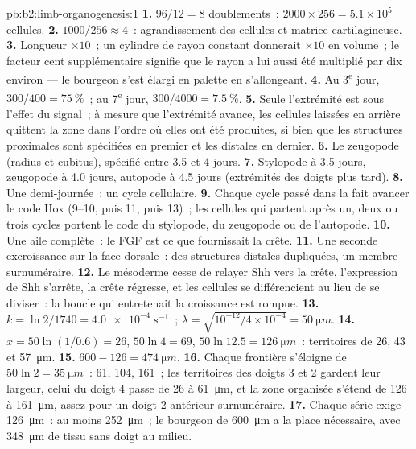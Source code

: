\begin{solution}{pb:b2:limb-organogenesis:1}
\textbf{1.} $96/12 = 8$ doublements~: $2000\times 256 = 5.1\times 10^{5}$
cellules.
\textbf{2.} $1000/256 \approx 4$~: agrandissement des cellules et
matrice cartilagineuse.
\textbf{3.} Longueur $\times 10$~; un cylindre de rayon constant
donnerait $\times 10$ en volume~; le facteur cent supplémentaire signifie
que le rayon a lui aussi été multiplié par dix environ --- le bourgeon
s'est élargi en palette en s'allongeant.
\textbf{4.} Au 3\textsuperscript{e} jour, $300/400 = \qty{75}{\%}$~; au
7\textsuperscript{e} jour, $300/4000 =
\qty{7.5}{\%}$.
\textbf{5.} Seule l'extrémité est sous l'effet du signal~; à mesure que
l'extrémité avance, les cellules laissées en arrière quittent la zone
dans l'ordre où elles ont été produites, si bien que les structures
proximales sont spécifiées en premier et les distales en dernier.
\textbf{6.} Le zeugopode (radius et cubitus), spécifié entre 3.5 et
4 jours.
\textbf{7.} Stylopode à 3.5 jours, zeugopode à 4.0 jours, autopode à
4.5 jours (extrémités des doigts plus tard).
\textbf{8.} Une demi-journée~: un cycle cellulaire.
\textbf{9.} Chaque cycle passé dans la  fait avancer
le code Hox (9--10, puis 11, puis 13)~; les cellules qui partent après
un, deux ou trois cycles portent le code du stylopode, du zeugopode ou de
l'autopode.
\textbf{10.} Une aile complète~: le FGF est ce que fournissait la crête.
\textbf{11.} Une seconde excroissance sur la face dorsale~: des
structures distales dupliquées, un membre surnuméraire.
\textbf{12.} Le mésoderme cesse de relayer Shh vers la crête,
l'expression de Shh s'arrête, la crête régresse, et les cellules se
différencient au lieu de se diviser~: la boucle qui entretenait la
croissance est rompue.
\textbf{13.} $k = \ln 2/1740 = \qty{4.0e-4}{s^{-1}}$~; $\lambda =
\sqrt{10^{-12}/4\times 10^{-4}} = \qty{50}{\micro m}$.
\textbf{14.} $x = 50\ln(1/0.6) = 26$, $50\ln 4 = 69$, $50\ln 12.5 =
\qty{126}{\micro m}$~: territoires de 26, 43 et \qty{57}{\micro m}.
\textbf{15.} $600 - 126 = \qty{474}{\micro m}$.
\textbf{16.} Chaque frontière s'éloigne de $50\ln 2 = \qty{35}{\micro
m}$~: 61, 104, 161~; les territoires des doigts 3 et 2 gardent leur
largeur, celui du doigt 4 passe de 26 à \qty{61}{\micro m}, et la zone
organisée s'étend de 126 à \qty{161}{\micro m}, assez pour un doigt 2
antérieur surnuméraire.
\textbf{17.} Chaque série exige \qty{126}{\micro m}~: au moins
\qty{252}{\micro m}~; le bourgeon de \qty{600}{\micro m} a la place
nécessaire, avec \qty{348}{\micro m} de tissu sans doigt au milieu.

\end{solution}
